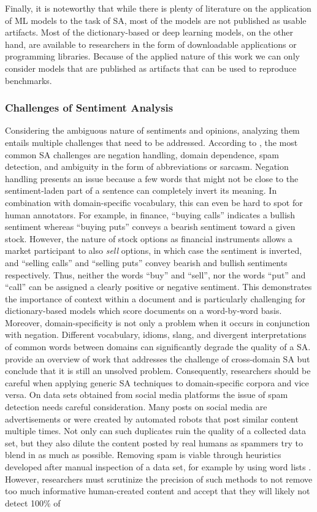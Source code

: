 Finally, it is noteworthy that while there is plenty of literature on the application of ML models to the task of SA, most of the models are not published as usable artifacts. Most of the dictionary-based or deep learning models, on the other hand, are available to researchers in the form of downloadable applications or programming libraries. Because of the applied nature of this work we can only consider models that are published as artifacts that can be used to reproduce benchmarks.


\subsubsection{Challenges of Sentiment Analysis}
\label{section-sa-challenges}
Considering the ambiguous nature of sentiments and opinions, analyzing them entails multiple challenges that need to be addressed. According to , the most common SA challenges are negation handling, domain dependence, spam detection, and ambiguity in the form of abbreviations or sarcasm. Negation handling presents an issue because a few words that might not be close to the sentiment-laden part of a sentence can completely invert its meaning. In combination with domain-specific vocabulary, this can even be hard to spot for human annotators. For example, in finance, ``buying calls'' indicates a bullish sentiment whereas ``buying puts'' conveys a bearish sentiment toward a given stock. However, the nature of stock options as financial instruments allows a market participant to also \emph{sell} options, in which case the sentiment is inverted, and ``selling calls'' and ``selling puts'' convey bearish and bullish sentiments respectively. Thus, neither the words ``buy'' and ``sell'', nor the words ``put'' and ``call'' can be assigned a clearly positive or negative sentiment. This demonstrates the importance of context within a document and is particularly challenging for dictionary-based models which score documents on a word-by-word basis. Moreover, domain-specificity is not only a problem when it occurs in conjunction with negation. Different vocabulary, idioms, slang, and divergent interpretations of common words between domains can significantly degrade the quality of a SA.  provide an overview of work that addresses the challenge of cross-domain SA but conclude that it is still an unsolved problem. Consequently, researchers should be careful when applying generic SA techniques to domain-specific corpora and vice versa. On data sets obtained from social media platforms the issue of spam detection needs careful consideration. Many posts on social media are advertisements or were created by automated robots that post similar content multiple times. Not only can such duplicates ruin the quality of a collected data set, but they also dilute the content posted by real humans as spammers try to blend in as much as possible. Removing spam is viable through heuristics developed after manual inspection of a data set, for example by using word lists . However, researchers must scrutinize the precision of such methods to not remove too much informative human-created content and accept that they will likely not detect 100\% of 